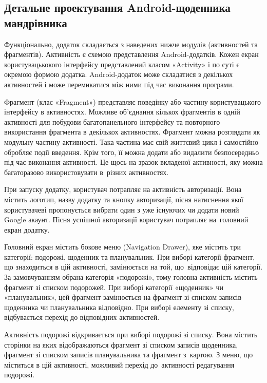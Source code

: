 \documentclass[../main.tex]{subfiles}
\begin{document}

\subsection{Детальне проектування Android-щоденника мандрівника} %
Функціонально, додаток складається з наведених нижче модулів (активностей та фрагментів). Активність є схемою представлення Android-додатків. Кожен екран користувацькокого інтерфейсу представлений класом «Activity» і по суті є окремою формою додатка. Android-додаток може складатися з декількох активностей і може перемикатися між ними під час виконання програми. 

Фрагмент (клас «Fragment») представляє поведінку або частину користувацького інтерфейсу в активностях. Можливе об'єднання кількох фрагментів в одній активності для побудови багатопанельного інтерфейсу та повторного використання фрагмента в декількох активностях. Фрагмент можна розглядати як модульну частину активності. Така частина має свій життєвий цикл і самостійно обробляє події введення. Крім того, її можна додати або видалити безпосередньо під час виконання активності. Це щось на зразок вкладеної активності, яку можна багаторазово використовувати в~різних активностях.

При запуску додатку, користувач потрапляє на активність авторизації. Вона містить логотип, назву додатку та кнопку авторизації, пісня натиснення якої  користувачеві пропонується вибрати один з уже існуючих чи додати новий Google акаунт. Пісня успішної авторизації користувач потрапляє на~головний екран додатку.

Головний екран містить бокове меню (Navigation Drawer), яке містить три категорії: подорожі, щоденник та планувальник. При виборі категорії фрагмент, що знаходиться в цій активності, замінюється на той, що~відповідає цій категорії. За замовчуванням обрана категорія «подорожі», тому головна активність містить фрагмент зі списком подорожей. При виборі категорії «щоденник» чи «планувальник», цей фрагмент замінюється на фрагмент зі списком записів щоденника чи планувальника відповідно. При виборі елементу зі списку, відбувається перехід до відповідних активностей.

Активність подорожі відкривається при виборі подорожі зі списку. Вона містить сторінки на яких відображаються фрагмент зі списком записів щоденника, фрагмент зі списком записів планувальника та фрагмент з~картою. З меню, що міститься в цій активності, можливий перехід до~активності редагування подорожі.
\end{document}
